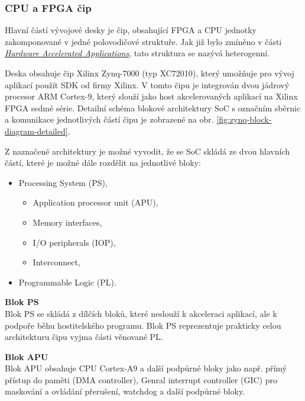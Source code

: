 \documentclass[a4paper, twoside, 11pt]{article}
\begin{document}
		\subsubsection{CPU a FPGA čip}
			Hlavní částí vývojové desky je čip, obsahující FPGA a CPU jednotky zakomponované v jedné polovodičové struktuře. Jak již bylo zmíněno v části \hyperref[subsec:hardware-accelerated-applications]{\textit{Hardware Accelerated Applications}}, tato struktura se nazývá heterogenní.\par
			Deska obsahuje čip Xilinx Zynq-7000 (typ XC72010), který umožňuje pro vývoj aplikací použít SDK od firmy Xilinx. V tomto čipu je integrován dvou jádrový procesor ARM Cortex-9, který slouží jako host akcelerovaných aplikací na Xilinx FPGA sedmé série. Detailní schéma blokové architektury SoC s označním sběrnic a komunikace jednotlivých částí čipu je zobrazené na obr. \ref{fig:zynq-block-diagram-detailed}.\par
			Z naznačené architektury je možné vyvodit, že se SoC skládá ze dvou hlavních částí, které je možné dále rozdělit na jednotlivé bloky:
			\begin{itemize}
				\item Processing System (PS),
				\begin{itemize}
					\item Application processor unit (APU),
					\item Memory interfaces,
					\item I/O peripherals (IOP),
					\item Interconnect,
				\end{itemize}
				\item Programmable Logic (PL).
			\end{itemize}
			\vspace*{0.25cm}
			\noindent\textbf{Blok PS}\\
			Blok PS se skládá z dílčích bloků, které neslouží k akceleraci aplikací, ale k podpoře běhu hostitelského programu. Blok PS reprezentuje prakticky celou architekturu čipu vyjma části věnované PL.\par\vspace*{0.25cm}
			\noindent\textbf{Blok APU}\\
			Blok APU obsahuje CPU Cortex-A9 a další podpůrné bloky jako např. přímý přístup do paměti (DMA controller), Genral interrupt controller (GIC) pro maskování a ovládání přerušení, watchdog a další podpůrné bloky.\par\vspace*{0.25cm}
\end{document}
